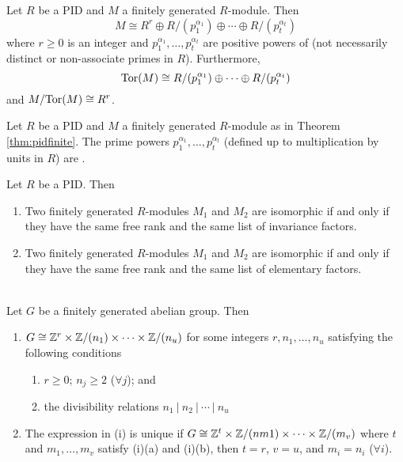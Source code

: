 \begin{theorem}
\label{thm:pidfinite}
Let $R$ be a PID and $M$ a finitely generated $R$-module. Then
\begin{equation}
M \cong R^r \oplus R/(p_1^{\alpha_1}) \oplus \cdots \oplus R/(p_t^{\alpha_t}) \nonumber
\end{equation}
where $r \geq 0$ is an integer and $ p_1^{\alpha_1}, \ldots, p_t^{\alpha_t}$ are positive powers of (not necessarily distinct or non-associate primes in $R$). Furthermore,
\begin{equation}
\textnormal{Tor}(M) \cong R/(p_1^{\alpha_1}) \oplus \cdots \oplus R/(p_t^{\alpha_t}) \nonumber
\end{equation}
and $M/\textnormal{Tor}(M) \cong R^r$.
\end{theorem}

\begin{definition}
Let $R$ be a PID and $M$ a finitely generated $R$-module as in Theorem \ref{thm:pidfinite}. The prime powers $p_1^{\alpha_1}, \ldots, p_t^{\alpha_t}$ (defined up to multiplication by units in $R$) are .
\end{definition}

\begin{theorem}
Let $R$ be a PID. Then
\begin{enumerate}[label=(\roman*)]
\item Two finitely generated $R$-modules $M_1$ and $M_2$ are isomorphic if and only if they have the same free rank and the same list of invariance factors.
\item Two finitely generated $R$-modules $M_1$ and $M_2$ are isomorphic if and only if they have the same free rank and the same list of elementary factors.
\end{enumerate}
\end{theorem}

\begin{theorem}
\label{thm:fundthmfgagiff}
\\
Let $G$ be a finitely generated abelian group. Then
\begin{enumerate}[label=(\roman*)]
\item $G \cong \mathbb{Z}^r \times \mathbb{Z}/(n_1) \times \cdots \times \mathbb{Z}/(n_u)$ for some integers $r, n_1, \ldots, n_u$ satisfying the following conditions
\begin{enumerate}[label=\alph*.]
\item $r \geq 0$; $n_j \geq 2$ ($\forall j$); and
\item the divisibility relations $n_1 \ | \ n_2 \ | \ \cdots \ | \ n_u$
\end{enumerate}
\item The expression in (i) is unique if $G \cong \mathbb{Z}^t \times \mathbb{Z}/(nm1) \times \cdots \times \mathbb{Z}/(m_v)$ where $t$ and $m_1, \ldots, m_v$ satisfy (i)(a) and (i)(b), then $t=r$, $v=u$, and $m_i = n_i$ ($\forall i$).
\end{enumerate}
\end{theorem}

